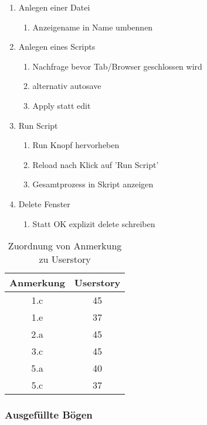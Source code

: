 \begin{enumerate}
\begin{enumerate}
\end{enumerate}
\item Anlegen einer Datei
\begin{enumerate}
	\item Anzeigename in Name umbennen
\end{enumerate}
\item Anlegen eines Scripts
\begin{enumerate}
	\item Nachfrage bevor Tab/Browser geschlossen wird
	\item alternativ autosave
	\item Apply statt edit
\end{enumerate}
\item Run Script
\begin{enumerate}
	\item Run Knopf hervorheben
	\item Reload nach Klick auf 'Run Script'
	\item Gesamtprozess in Skript anzeigen
\end{enumerate}
\item Delete Fenster
\begin{enumerate}
	\item Statt OK explizit delete schreiben
\end{enumerate}
\end{enumerate}

\begin{table}[H]
	\centering
	\begin{tabular}{c|c}
		Anmerkung & Userstory \\\hline
		1.c & 45\\
		1.e & 37\\
		2.a & 45\\
		3.c & 45\\
		5.a & 40\\
		5.c & 37\\
	\end{tabular}
	\caption{Zuordnung von Anmerkung zu Userstory}
	\label{studie1_us}
\end{table}

\subsubsection{Ausgefüllte Bögen}
\begin{center}
	
\end{center}

